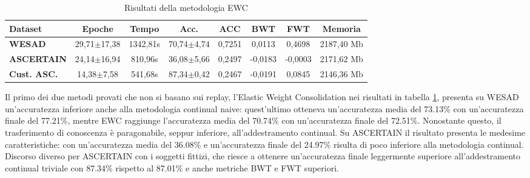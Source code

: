 \begin{table}[h]
\footnotesize
    \begin{tabular}{l|c|c|c|c|c|c|c}
        \textbf{Dataset} & \textbf{Epoche} & \textbf{Tempo} & \textbf{Acc.} & \textbf{ACC} & \textbf{BWT} & \textbf{FWT} & \textbf{Memoria}\\
        \hline
        \textbf{WESAD} & 29,71$\pm$17,38 & 1342,81s & 70,74$\pm$4,74 & 0,7251 & 0,0113 & 0,4698 & 2187,40 Mb\\
        \textbf{ASCERTAIN} & 24,14$\pm$16,94 & 810,96s & 36,08$\pm$5,66 & 0,2497 & -0,0183 & -0,0003 & 2171,62 Mb\\
        \textbf{Cust. ASC.} & 14,38$\pm$7,58 & 541,68s & 87,34$\pm$0,42 & 0,2467 & -0,0191 & 0,0845 & 2146,36 Mb\\
    \end{tabular}
    \caption{Risultati della metodologia EWC}
    \label{tab:resewc}
\end{table}
Il primo dei due metodi provati che non si basano sui replay, l'Elastic Weight Consolidation nei risultati in tabella \ref{tab:resewc}, presenta su WESAD un'accuratezza inferiore anche alla metodologia continual naive: quest'ultimo otteneva un'accuratezza media del 73.13\% con un'accuratezza finale del 77.21\%, mentre EWC raggiunge l'accuratezza media del 70.74\% con un'accuratezza finale del 72.51\%. Nonostante questo, il trasferimento di conoscenza è paragonabile, seppur inferiore, all'addestramento continual. Su ASCERTAIN il risultato presenta le medesime caratteristiche: con un'accuratezza media del 36.08\% e un'accuratezza finale del 24.97\% risulta di poco inferiore alla metodologia continual. Discorso diverso per ASCERTAIN con i soggetti fittizi, che riesce a ottenere un'accuratezza finale leggermente superiore all'addestramento continual triviale con 87.34\% rispetto al 87.01\% e anche metriche BWT e FWT superiori.

